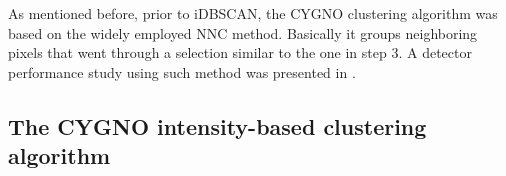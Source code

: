 \documentclass[a4paper,11pt]{article}
\begin{document}





As mentioned before, prior to iDBSCAN, the CYGNO clustering algorithm was based on the widely employed NNC method. Basically it groups neighboring pixels that went through a selection similar to the one in step 3. A detector performance study using such method was presented in \cite{bib:fe55}.

\subsection{The CYGNO intensity-based clustering algorithm}
\label{sec:dbscan}
\end{document}
